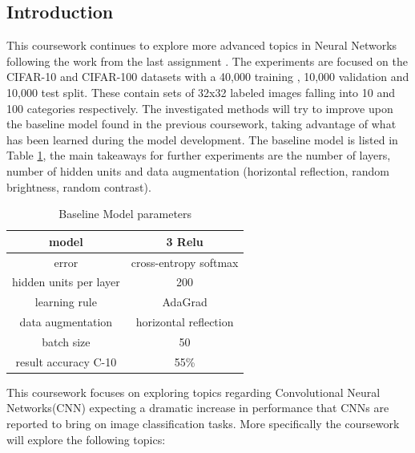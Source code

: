 \documentclass[12pt]{article}
\begin{document}
\maketitle


\subsection*{Introduction}

This coursework continues to explore more advanced topics in Neural Networks following the work from the last assignment \cite{me}. The experiments are focused on the CIFAR-10 and CIFAR-100 datasets with a 40,000 training , 10,000 validation and 10,000 test split. These contain sets of 32x32 labeled images falling into 10 and 100 categories respectively. The investigated methods will try to improve upon the baseline model found in the previous coursework, taking advantage of what has been learned during the model development. The baseline model is listed in Table \ref{tab:baseline}, the main takeaways for further experiments are the number of layers, number of hidden units and data augmentation (horizontal reflection, random brightness, random contrast). 


\begin{table}[H]
\centering
\begin{tabular}[h]{| c | c |}
\hline
model & 3 Relu  \\
\hline
error & cross-entropy softmax   \\
\hline
hidden units per layer & 200   \\
\hline
learning rule & AdaGrad   \\
\hline 
data augmentation & horizontal reflection  \\
\hline
batch size & 50   \\
\hline
result accuracy C-10& 55\%   \\
\hline
\end{tabular} 
\caption{Baseline Model parameters}
\label{tab:baseline}
\end{table}

This coursework focuses on exploring topics regarding Convolutional Neural Networks(CNN) expecting a dramatic increase in performance that CNNs are reported to bring on image classification tasks\cite{inspiration}\cite{bestprac}\cite{frac}. More specifically the coursework will explore the following topics:
\end{document}
